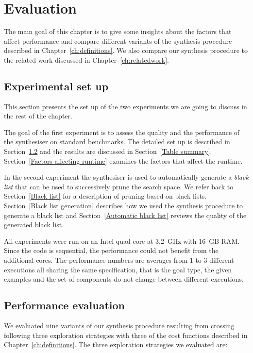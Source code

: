 \lstset{style=plain}

\chapter{Evaluation} \label{ch:evaluation}

The main goal of this chapter is to give some insights about the factors that affect performance and compare different variants of the synthesis procedure described in Chapter~\ref{ch:definitions}. We also compare our synthesis procedure to the related work discussed in Chapter~\ref{ch:relatedwork}.


\section{Experimental set up}
This section presents the set up of the two experiments we are going to discuss in the rest of the chapter.

The goal of the first experiment is to assess the quality and the performance of the synthesiser on standard benchmarks. The detailed set up is described in Section~\ref{Evaluation on benchmarks} and the results are discussed in Section~\ref{Table summary}. Section~\ref{Factors affecting runtime} examines the factors that affect the runtime.

In the second experiment the synthesiser is used to automatically generate a \emph{black list} that can be used to successively prune the search space. We refer back to Section~\ref{Black list} for a description of pruning based on black lists. Section~\ref{Black list generation} describes how we used the synthesis procedure to generate a black list and Section~\ref{Automatic black list} reviews the quality of the generated black list.

All experiments were run on an Intel quad-core at 3.2~GHz with 16~GB RAM. Since the code is sequential, the performance could not benefit from the additional cores. The performance numbers are averages from 1 to 3 different executions all sharing the same specification, that is the goal type, the given examples and the set of components do not change between different executions.

\section{Performance evaluation}\label{Evaluation on benchmarks}

We evaluated nine variants of our synthesis procedure resulting from crossing following three exploration strategies with three of the cost functions described in Chapter~\ref{ch:definitions}. The three exploration strategies we evaluated are:

